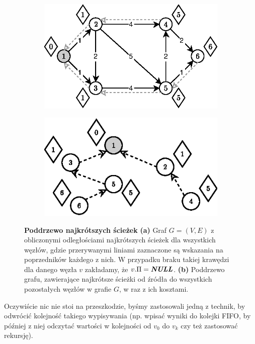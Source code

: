 \begin{figure}[!htbp]
	\centering
	\begin{subfigure}[b]{0.45\textwidth}
		\includegraphics[width=\textwidth]{Chapter_I/10/1_10a.eps}
		\caption{}
	\end{subfigure}%
	\qquad
	\begin{subfigure}[b]{0.45\textwidth}
		\includegraphics[width=\textwidth]{Chapter_I/10/1_10b.eps}
		\caption{}
	\end{subfigure}
	\caption{\textbf{Poddrzewo najkrótszych ścieżek} \textbf{(a)} Graf $G = \left( V, E \right)$ z obliczonymi odległościami najkrótszych ścieżek dla wszystkich węzłów, gdzie przerywanymi liniami zaznaczone są wskazania na poprzedników każdego z nich. W przypadku braku takiej krawędzi dla danego węzła $v$ zakładamy, że $v.\Pi = \emph{\textbf{NULL}}$. \textbf{(b)} Poddrzewo grafu, zawierające najkrótsze ścieżki od źródła do wszystkich pozostałych węzłów w grafie $G$, w raz z ich kosztami.}\label{fig:shortestPathTree}
\end{figure}

Oczywiście nic nie stoi na przeszkodzie, byśmy zastosowali jedną z technik, by odwrócić kolejność takiego wypisywania (np. wpisać wyniki do kolejki FIFO, by później z niej odczytać wartości w kolejności od $v_{0}$ do $v_{k}$ czy też zastosować rekursję).

